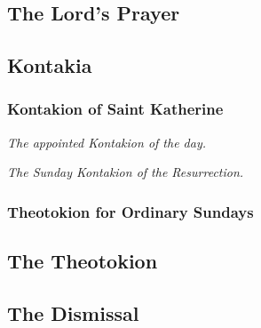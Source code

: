 \documentclass[twoside, letterpaper, 12pt]{report}
\begin{document}
		\subsection*{The Lord’s Prayer}

			\people \lordsprayer

			\reader \throughtheprayers

			\lilyamen

		\subsection*{Kontakia}

			\subsubsection*{Kontakion of Saint Katherine}
			\lilykontakkatherine

			\people \emph{The appointed Kontakion of the day.}

			\reader \glory

			\people \emph{The Sunday Kontakion of the Resurrection.}

			\reader \nowandever

		\subsubsection*{Theotokion for Ordinary Sundays}

			\lilysundaytheotokion

			\reader \lhmForty

				\lilyblessedbethename

			\reader \gne



			\reader \gne

		\subsection*{The Theotokion}

			\lilytrulymeet

		\subsection*{The Dismissal}

			\lilydismissal

			\reader \throughtheprayers

			\lilyamen

	\pagebreak \ \thispagestyle{empty}
\end{document}
